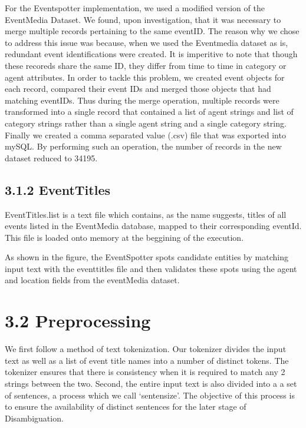 \documentclass[a4paper,11pt]{report}
\begin{document}
For the Eventspotter implementation, we used a modified version of the EventMedia Dataset. We found, upon investigation, that it was necessary to merge multiple records pertaining to the same eventID. The reason why we chose to address this issue was because, when we used the Eventmedia dataset as is, redundant event identifications were created. It is imperitive to note that though these recoreds share the same ID, they differ from time to time in category or agent attributes. In order to tackle this problem, we created event objects for each record, compared their event IDs and merged those objects that had matching eventIDs. Thus during the merge operation, multiple records were transformed into a single record that contained a list of agent strings and list of category strings rather than a single agent string and a single category string. Finally we created a comma separated value (.csv) file that was exported into mySQL. By performing such an operation, the number of records in the new dataset reduced to 34195.   
 

\subsection*{3.1.2 EventTitles}
EventTitles.list is a text file which contains, as the name suggests, titles of all events listed in the EventMedia database, mapped to their corresponding eventId. This file is loaded onto memory at the beggining of the execution.

As shown in the figure, the EventSpotter spots candidate entities by matching input text with the eventtitles file and then validates these spots using the agent and location fields from the eventMedia dataset.

\section*{3.2 Preprocessing}

We first follow a method of text tokenization. Our tokenizer divides the input text as well as a list of event title names into a number of distinct tokens. The tokenizer ensures that there is consistency when it is required to match any 2 strings between the two. Second, the entire input text is also divided into a a set of sentences, a process which we call `sentensize’. The objective of this process is to ensure the availability of distinct sentences for the later stage of Disambiguation. 
\end{document}
